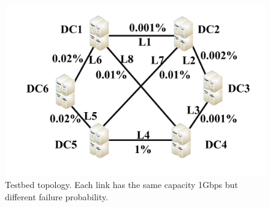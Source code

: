 \documentclass[sigconf]{acmart}
\begin{document}
%
%
%


 \begin{figure}
\begin{center}
\includegraphics [width=0.8\columnwidth] {fig/testbed.pdf}
\caption{Testbed topology. Each link has the same capacity 1Gbps but  different failure probability.}
\label{testbed}
\end{center}
\end{figure}
\end{document}
